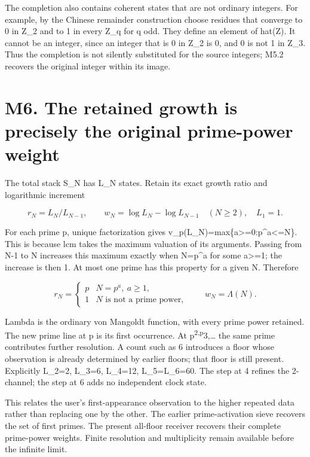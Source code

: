 The completion also contains coherent states that are not ordinary
integers. For example, by the Chinese remainder construction choose
residues that converge to 0 in Z\_2 and to 1 in every Z\_q for q odd.
They define an element of hat(Z). It cannot be an integer, since an
integer that is 0 in Z\_2 is 0, and 0 is not 1 in Z\_3. Thus the
completion is not silently substituted for the source integers; M5.2
recovers the original integer within its image.

\section{M6. The retained growth is precisely the original prime-power
weight}\label{m6.-the-retained-growth-is-precisely-the-original-prime-power-weight}

The total stack S\_N has L\_N states. Retain its exact growth ratio and
logarithmic increment

\[
r_N=L_N/L_{N-1},\qquad
w_N=\log L_N-\log L_{N-1}\quad(N\ge2),\quad L_1=1.
\tag{M6.1}
\]

For each prime p, unique factorization gives
v\_p(L\_N)=max\{a\textgreater=0:p\^{}a\textless=N\}. This is because lcm
takes the maximum valuation of its arguments. Passing from N-1 to N
increases this maximum exactly when N=p\^{}a for some a\textgreater=1;
the increase is then 1. At most one prime has this property for a given
N. Therefore

\[
r_N=\begin{cases}p&N=p^a,\ a\ge1,\\1&N\text{ is not a prime power},\end{cases}
\qquad
\boxed{w_N=\Lambda(N).}
\tag{M6.2}
\]

Lambda is the ordinary von Mangoldt function, with every prime power
retained. The new prime line at p is its first occurrence. At
p\textsuperscript{2,p}3,\ldots{} the same prime contributes further
resolution. A count such as 6 introduces a floor whose observation is
already determined by earlier floors; that floor is still present.
Explicitly L\_2=2, L\_3=6, L\_4=12, L\_5=L\_6=60. The step at 4 refines
the 2-channel; the step at 6 adds no independent clock state.

This relates the user's first-appearance observation to the higher
repeated data rather than replacing one by the other. The earlier
prime-activation sieve recovers the set of first primes. The present
all-floor receiver recovers their complete prime-power weights. Finite
resolution and multiplicity remain available before the infinite limit.

